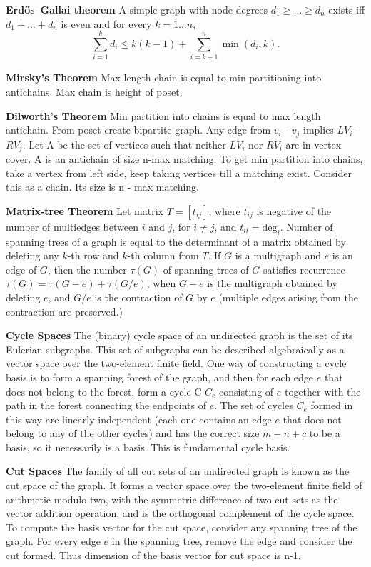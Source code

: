 \textbf{Erdős–Gallai theorem}
A simple graph with node degrees $d_1 \ge \dots \ge d_n$ exists iff $d_1 + \dots + d_n$ is even and for every $k = 1\dots n$,
\[ \sum _{i=1}^{k}d_{i}\leq k(k-1)+\sum _{i=k+1}^{n}\min(d_{i},k). \]

\textbf{Mirsky's Theorem} Max length chain is equal to min partitioning into antichains. Max chain is height of poset.

\textbf{Dilworth's Theorem} Min partition into chains is equal to max length antichain. From poset create bipartite graph. Any edge from $v_{i}$ - $v_{j}$ implies  $LV_{i}$ - $RV_{j}$. Let A be the set of vertices such that neither $LV_{i}$ nor $RV_{i}$ are in vertex cover. A is an antichain of size n-max matching. To get min partition into chains, take a vertex from left side, keep taking vertices till a matching exist. Consider this as a chain. Its size is n - max matching.

\textbf{Matrix-tree Theorem} Let matrix $T = [t_{ij}]$, where $t_{ij}$ is negative of the number of multiedges between $i$ and $j$, for $i \ne j$, and $t_{ii} = \mbox{deg}_i$. Number of spanning trees of a graph is equal to the determinant of a matrix obtained by deleting any $k$-th row and $k$-th column from $T$. If $G$ is a multigraph and $e$ is an edge of $G$, then the number $\tau(G)$ of spanning trees of $G$ satisfies recurrence $\tau(G) = \tau(G-e) + \tau(G/e)$, when $G-e$ is the multigraph obtained by deleting $e$, and $G/e$ is the contraction of $G$ by $e$ (multiple edges arising from the contraction are preserved.)

\textbf{Cycle Spaces} The (binary) cycle space of an undirected graph is the set of its Eulerian subgraphs. This set of subgraphs can be described algebraically as a vector space over the two-element finite field. One way of constructing a cycle basis is to form a spanning forest of the graph, and then for each edge $e$ that does not belong to the forest, form a cycle C  $C_{e}$ consisting of $e$ together with the path in the forest connecting the endpoints of $e$. The set of cycles $C_{e}$ formed in this way are linearly independent (each one contains an edge $e$ that does not belong to any of the other cycles) and has the correct size $m - n + c$ to be a basis, so it necessarily is a basis. This is fundamental cycle basis.

\textbf{Cut Spaces} The family of all cut sets of an undirected graph is known as the cut space of the graph. It forms a vector space over the two-element finite field of arithmetic modulo two, with the symmetric difference of two cut sets as the vector addition operation, and is the orthogonal complement of the cycle space. To compute the basis vector for the cut space, consider any spanning tree of the graph. For every edge $e$ in the spanning tree, remove the edge and consider the cut formed. Thus dimension of the basis vector for cut space is n-1.

